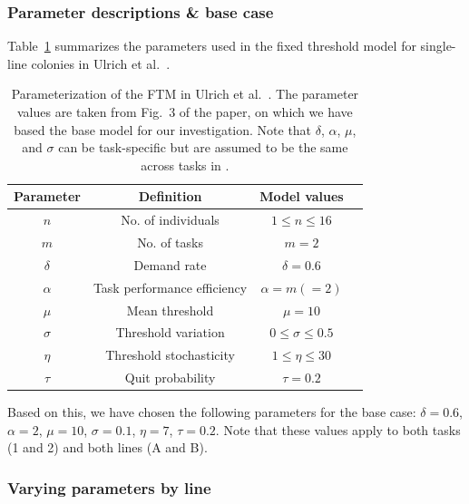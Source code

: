 \documentclass[11pt]{article}
\begin{document}
\subsubsection{Parameter descriptions \& base case} \label{sec:original}
Table~\ref{tab:original} summarizes the parameters used in the fixed threshold model for single-line colonies in Ulrich et al.~\cite{ulrich2018}.
\begin{table}[H] \small
  \begin{center}
    \begin{tabular}{|c|c|c|c|} 
      \hline
      \textbf{Parameter} & \textbf{Definition} & \textbf{Model values} \\ \hline
      $n$ & No. of individuals & $1\leq n \leq16$ \\ \hline
      $m$ & No. of tasks & $m = 2$ \\ \hline
      $\delta$ & Demand rate & $\delta = 0.6$  \\ \hline
      $\alpha$ & Task performance efficiency & $\alpha = m(=2) $  \\ \hline
      $\mu$ & Mean threshold & $\mu = 10$  \\ \hline
      $\sigma$ & Threshold variation & $0 \leq \sigma \leq 0.5$  \\ \hline
      $\eta$ & Threshold stochasticity & $1 \leq \eta \leq 30 $ \\ \hline
      $\tau$ & Quit probability & $\tau = 0.2$ \\ \hline
    \end{tabular}
    \caption{Parameterization of the FTM in Ulrich et al.~\cite{ulrich2018}. The parameter values are taken from Fig.~3 of the paper, on which we have based the base model for our investigation. Note that $\delta$, $\alpha$, $\mu$, and $\sigma$ can be task-specific but are assumed to be the same across tasks in \cite{ulrich2018}.}
    \label{tab:original}
  \end{center}
\end{table}

\vspace{-20pt}
Based on this, we have chosen the following parameters for the base case: $\delta = 0.6$, $\alpha = 2$, $\mu = 10$, $\sigma = 0.1$, $\eta = 7$, $\tau = 0.2$. Note that these values apply to both tasks (1 and 2) and both lines (A and B).

\subsubsection{Varying parameters by line} 
\end{document}
